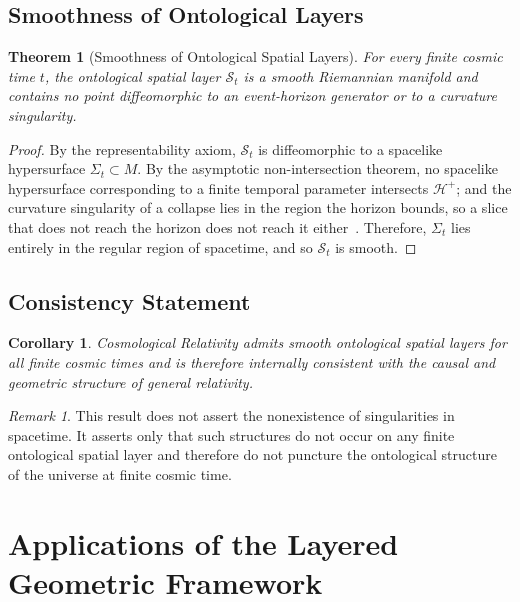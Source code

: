 \documentclass[11pt,a4paper]{article}
\theoremstyle{plain}
\newtheorem{theorem}{Theorem}
\newtheorem{corollary}{Corollary}
\theoremstyle{definition}
\theoremstyle{remark}
\newtheorem{remark}{Remark}
\begin{document}
\subsection{Smoothness of Ontological Layers}

\begin{theorem}[Smoothness of Ontological Spatial Layers]
For every finite cosmic time $t$, the ontological spatial layer $\mathcal{S}_t$ is a smooth Riemannian manifold and contains no point diffeomorphic to an event-horizon generator or to a curvature singularity.
\end{theorem}

\begin{proof}
By the representability axiom, $\mathcal{S}_t$ is diffeomorphic to a spacelike hypersurface $\Sigma_t\subset M$. By the asymptotic non-intersection theorem, no spacelike hypersurface corresponding to a finite temporal parameter intersects $\mathcal{H}^+$; and the curvature singularity of a collapse lies in the region the horizon bounds, so a slice that does not reach the horizon does not reach it either~\cite{JanzenBHcausality}. Therefore, $\Sigma_t$ lies entirely in the regular region of spacetime, and so $\mathcal{S}_t$ is smooth.
\end{proof}

\subsection{Consistency Statement}

\begin{corollary}
Cosmological Relativity admits smooth ontological spatial layers for all finite cosmic times and is therefore internally consistent with the causal and geometric structure of general relativity.
\end{corollary}

\begin{remark}
This result does not assert the nonexistence of singularities in spacetime. It asserts only that such structures do not occur on any finite ontological spatial layer and therefore do not puncture the ontological structure of the universe at finite cosmic time.
\end{remark}

\section{Applications of the Layered Geometric Framework}\label{sec:CR-applications}
\end{document}
